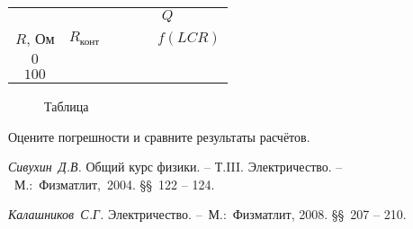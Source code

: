 \begin{lab:task}
\begin{center}
\begin{tabular}{|c|c|c|c|c|c|}
\hline
& & \multicolumn{4}{c|}{$Q$}\\
\cline{3-6}
$R$, Ом & $R_{\text{конт}}$ & & & &$f(LCR)$\\
\hline
$0$ & & & & & \\
$100$ & & & & &\\
\hline
\end{tabular}
\end{center}


\begin{figure}[h!]
	\centering
	\caption{Таблица}
\end{figure}

	\item Оцените погрешности и сравните результаты расчётов.

\end{lab:task}



\begin{lab:literature}
	\item \emph{Сивухин~Д.В.} Общий курс физики. -- Т.III. Электричество. -- ~М.:~Физматлит,~2004. \S\S~122 -- 124.

	\item \emph{Калашников~С.Г.} Электричество. --~М.:~Физматлит, 2008. \S\S~207 -- 210.
\end{lab:literature}
